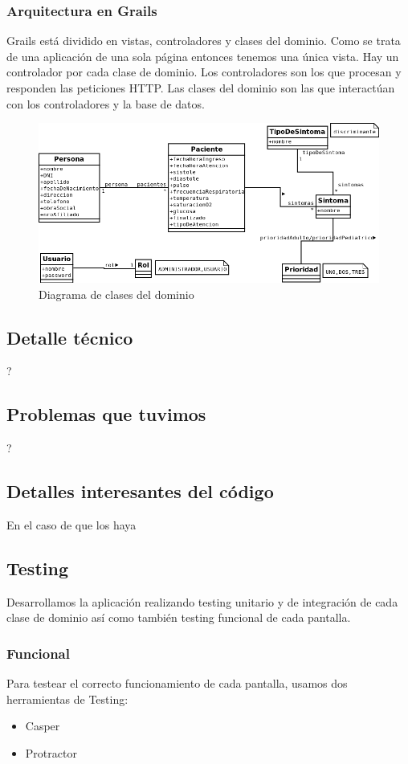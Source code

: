 \subsubsection{Arquitectura en Grails}
Grails está dividido en vistas, controladores y clases del dominio. Como se trata de una aplicación de una sola página entonces tenemos una única vista. Hay un controlador por cada clase de dominio. Los controladores son los que procesan y responden las peticiones HTTP. Las clases del dominio son las que interactúan con los controladores y la base de datos.
\begin{figure}[h]
\centering
\includegraphics[width=1.2\textwidth]{triage.png}
\caption{Diagrama de clases del dominio}
\end{figure}


\subsection{Detalle técnico}
?

\subsection{Problemas que tuvimos}
?

\subsection{Detalles interesantes del código}
En el caso de que los haya 




\subsection{Testing}
Desarrollamos la aplicación realizando testing unitario y de integración de cada clase de dominio así como también testing funcional de cada pantalla.
\subsubsection{Funcional}
Para testear el correcto funcionamiento de cada pantalla, usamos dos herramientas de Testing:
\begin{itemize}
\item Casper
\item Protractor
\end{itemize}

